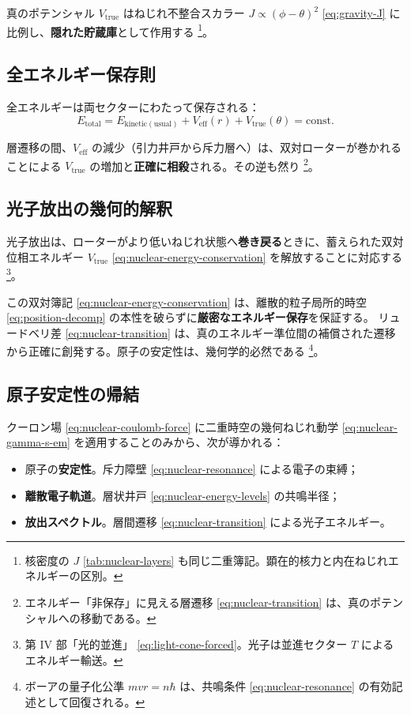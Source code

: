 \documentclass[dvipdfmx,a4paper,oneside]{jsbook}
\numberwithin{equation}{chapter}
\begin{document}
真のポテンシャル \(V_{\mathrm{true}}\) はねじれ不整合スカラー \(J \propto (\phi - \theta)^{2}\) \eqref{eq:gravity-J} に比例し、\textbf{隠れた貯蔵庫}として作用する \footnote{核密度の \(J\) \eqref{tab:nuclear-layers} も同じ二重簿記。顕在的核力と内在ねじれエネルギーの区別。}。

\subsection{全エネルギー保存則}

全エネルギーは両セクターにわたって保存される：
\begin{equation}
  \boxed{\;
  E_{\mathrm{total}}
  = E_{\mathrm{kinetic(usual)}}
  + V_{\mathrm{eff}}(r)
  + V_{\mathrm{true}}(\theta)
  = \mathrm{const}.
  \;}
  \label{eq:nuclear-energy-conservation}
\end{equation}

層遷移の間、\(V_{\mathrm{eff}}\) の減少（引力井戸から斥力層へ）は、双対ローターが巻かれることによる \(V_{\mathrm{true}}\) の増加と\textbf{正確に相殺}される。その逆も然り \footnote{エネルギー「非保存」に見える層遷移 \eqref{eq:nuclear-transition} は、真のポテンシャルへの移動である。}。

\subsection{光子放出の幾何的解釈}

光子放出は、ローターがより低いねじれ状態へ\textbf{巻き戻る}ときに、蓄えられた双対位相エネルギー \(V_{\mathrm{true}}\) \eqref{eq:nuclear-energy-conservation} を解放することに対応する \footnote{第 IV 部「光的並進」 \eqref{eq:light-cone-forced}。光子は並進セクター \(T\) によるエネルギー輸送。}。

この双対簿記 \eqref{eq:nuclear-energy-conservation} は、離散的粒子局所的時空 \eqref{eq:position-decomp} の本性を破らずに\textbf{厳密なエネルギー保存}を保証する。
リュードベリ差 \eqref{eq:nuclear-transition} は、真のエネルギー準位間の補償された遷移から正確に創発する。原子の安定性は、幾何学的必然である \footnote{ボーアの量子化公準 \(mvr = n\hbar\) は、共鳴条件 \eqref{eq:nuclear-resonance} の有効記述として回復される。}。

\subsection{原子安定性の帰結}

クーロン場 \eqref{eq:nuclear-coulomb-force} に二重時空の幾何ねじれ動学 \eqref{eq:nuclear-gamma-s-em} を適用することのみから、次が導かれる：
\begin{itemize}[leftmargin=2em]
  \item 原子の\textbf{安定性}。斥力障壁 \eqref{eq:nuclear-resonance} による電子の束縛；
  \item \textbf{離散電子軌道}。層状井戸 \eqref{eq:nuclear-energy-levels} の共鳴半径；
  \item \textbf{放出スペクトル}。層間遷移 \eqref{eq:nuclear-transition} による光子エネルギー。
\end{itemize}
\end{document}
